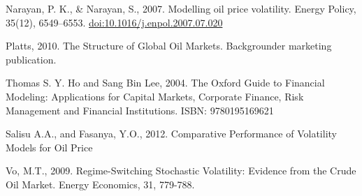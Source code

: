 \documentclass[]{article}
\begin{document}
Narayan, P. K., \& Narayan, S., 2007. Modelling oil price volatility.
Energy Policy, 35(12), 6549--6553. \url{doi:10.1016/j.enpol.2007.07.020}

Platts, 2010. The Structure of Global Oil Markets. Backgrounder
marketing publication.

Thomas S. Y. Ho and Sang Bin Lee, 2004. The Oxford Guide to Financial
Modeling: Applications for Capital Markets, Corporate Finance, Risk
Management and Financial Institutions. ISBN: 9780195169621

Salisu A.A., and Fasanya, Y.O., 2012. Comparative Performance of
Volatility Models for Oil Price

Vo, M.T., 2009. Regime-Switching Stochastic Volatility: Evidence from
the Crude Oil Market. Energy Economics, 31, 779-788.
\end{document}
